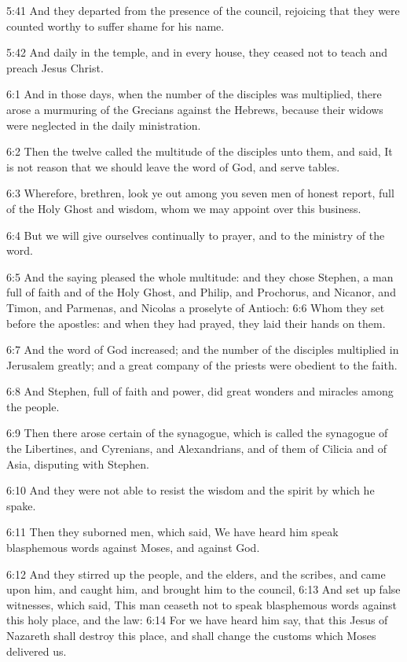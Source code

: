 5:41 And they departed from the presence of the council, rejoicing
that they were counted worthy to suffer shame for his name.

5:42 And daily in the temple, and in every house, they ceased not to
teach and preach Jesus Christ.

6:1 And in those days, when the number of the disciples was
multiplied, there arose a murmuring of the Grecians against the
Hebrews, because their widows were neglected in the daily
ministration.

6:2 Then the twelve called the multitude of the disciples unto them,
and said, It is not reason that we should leave the word of God, and
serve tables.

6:3 Wherefore, brethren, look ye out among you seven men of honest
report, full of the Holy Ghost and wisdom, whom we may appoint over
this business.

6:4 But we will give ourselves continually to prayer, and to the
ministry of the word.

6:5 And the saying pleased the whole multitude: and they chose
Stephen, a man full of faith and of the Holy Ghost, and Philip, and
Prochorus, and Nicanor, and Timon, and Parmenas, and Nicolas a
proselyte of Antioch: 6:6 Whom they set before the apostles: and when
they had prayed, they laid their hands on them.

6:7 And the word of God increased; and the number of the disciples
multiplied in Jerusalem greatly; and a great company of the priests
were obedient to the faith.

6:8 And Stephen, full of faith and power, did great wonders and
miracles among the people.

6:9 Then there arose certain of the synagogue, which is called the
synagogue of the Libertines, and Cyrenians, and Alexandrians, and of
them of Cilicia and of Asia, disputing with Stephen.

6:10 And they were not able to resist the wisdom and the spirit by
which he spake.

6:11 Then they suborned men, which said, We have heard him speak
blasphemous words against Moses, and against God.

6:12 And they stirred up the people, and the elders, and the scribes,
and came upon him, and caught him, and brought him to the council,
6:13 And set up false witnesses, which said, This man ceaseth not to
speak blasphemous words against this holy place, and the law: 6:14 For
we have heard him say, that this Jesus of Nazareth shall destroy this
place, and shall change the customs which Moses delivered us.

